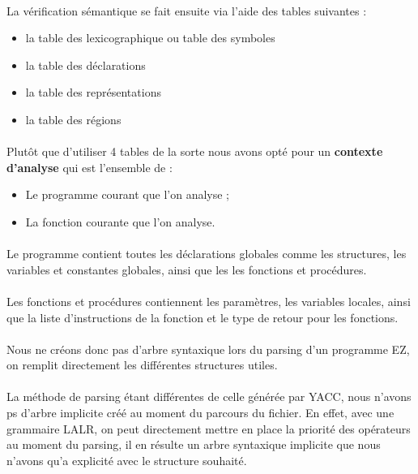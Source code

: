 \paragraph{}La vérification sémantique se fait ensuite via l'aide des tables 
suivantes :

\begin{itemize}
 \item la table des lexicographique ou table des symboles
 \item la table des déclarations
 \item la table des représentations
 \item la table des régions
\end{itemize}

\paragraph{}Plutôt que d'utiliser 4 tables de la sorte nous avons opté pour 
un \textbf{contexte d'analyse} qui est l'ensemble de :
\begin{itemize}
    \item Le programme courant que l'on analyse ;
    \item La fonction courante que l'on analyse.
\end{itemize}

\paragraph{}Le programme contient toutes les déclarations globales comme les 
structures, les variables et constantes globales, ainsi que les les fonctions 
et procédures.

\paragraph{}Les fonctions et procédures contiennent les paramètres, les 
variables locales, ainsi que la liste d'instructions de la fonction et le type 
de retour pour les fonctions.

\paragraph{}Nous ne créons donc pas d'arbre syntaxique lors du parsing d'un 
programme EZ, on remplit directement les différentes structures utiles. 

\paragraph{} La méthode de parsing étant différentes de celle générée par YACC, 
nous n'avons ps d'arbre implicite créé au moment du parcours du fichier. En 
effet, avec une grammaire LALR, on peut directement mettre en place la priorité 
des opérateurs au moment du parsing, il en résulte un arbre syntaxique 
implicite que nous n'avons qu'a explicité avec le structure souhaité.

